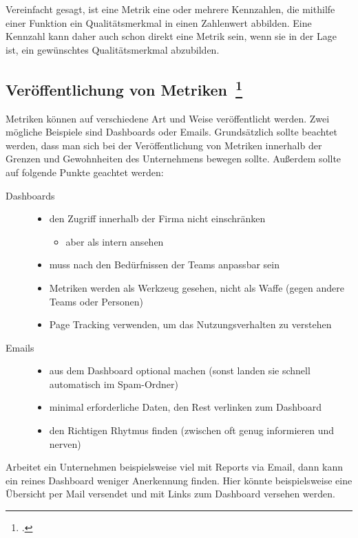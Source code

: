 Vereinfacht gesagt, ist eine Metrik eine oder mehrere Kennzahlen, die mithilfe einer Funktion ein Qualitätsmerkmal in einen Zahlenwert abbilden.
Eine Kennzahl kann daher auch schon direkt eine Metrik sein, wenn sie in der Lage ist, ein gewünschtes Qualitätsmerkmal abzubilden.

\subsection[Veröffentlichung von Metriken]{Veröffentlichung von Metriken~\footcite[vgl.][S.177ff]{davis_agile_2015}}

Metriken können auf verschiedene Art und Weise veröffentlicht werden. Zwei mögliche Beispiele sind Dashboards oder Emails.
Grundsätzlich sollte beachtet werden, dass man sich bei der Veröffentlichung von Metriken innerhalb der Grenzen und Gewohnheiten des Unternehmens bewegen sollte.
Außerdem sollte auf folgende Punkte geachtet werden:

\begin{description}
  \item[Dashboards] \hfill
  \begin{itemize}[noitemsep]
    \item den Zugriff innerhalb der Firma nicht einschränken
    \begin{itemize}[noitemsep]
      \item aber als intern ansehen
    \end{itemize}
    \item muss nach den Bedürfnissen der Teams anpassbar sein
    \item Metriken werden als Werkzeug gesehen, nicht als Waffe (gegen andere Teams oder Personen)
    \item Page Tracking verwenden, um das Nutzungsverhalten zu verstehen
  \end{itemize}
  \item[Emails] \hfill
  \begin{itemize}[noitemsep]
    \item aus dem Dashboard optional machen (sonst landen sie schnell automatisch im Spam-Ordner)
    \item minimal erforderliche Daten, den Rest verlinken zum Dashboard
    \item den Richtigen Rhytmus finden (zwischen oft genug informieren und nerven)
  \end{itemize}
\end{description}

Arbeitet ein Unternehmen beispielsweise viel mit Reports via Email, dann kann ein reines Dashboard weniger Anerkennung finden. Hier könnte beispielsweise eine Übersicht per Mail versendet und mit Links zum Dashboard versehen werden.

